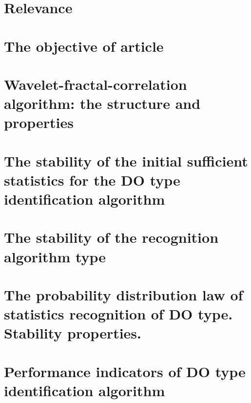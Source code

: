 \documentclass[
11pt,%
tightenlines,%
twoside,%
onecolumn,%
nofloats,%
nobibnotes,%
nofootinbib,%
superscriptaddress,%
noshowpacs,%
centertags]%
{revtex4}
\begin{document}


\maketitle


\section{Relevance}



\section{The objective of article}



\section{Wavelet-fractal-correlation algorithm: the structure and properties}



\section{The stability of the initial sufficient statistics for the DO type identification algorithm}



\section{The stability of the recognition algorithm type}



\section{The probability distribution law of statistics recognition of DO type. Stability properties.}



\section{Performance indicators of DO type identification algorithm}
\end{document}
